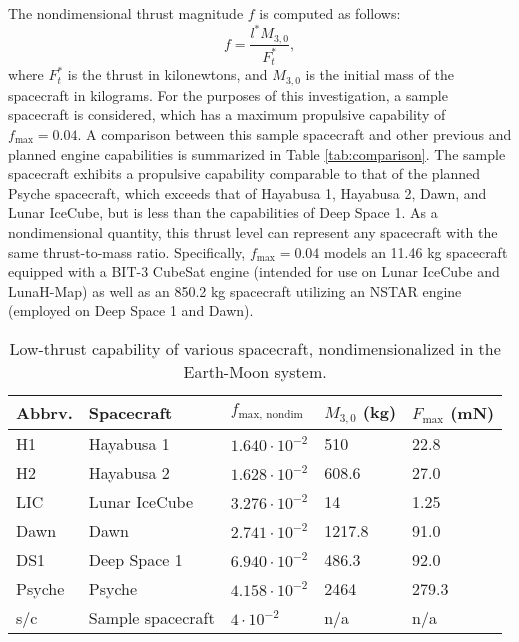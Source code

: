 \documentclass[conference]{IEEEtran}
\begin{document}
The nondimensional thrust magnitude \( f \) is computed as follows:
\begin{equation}
f = \frac{l^* M_{3,0}}{F_t^*},
\end{equation}
where \( F_t^* \) is the thrust in kilonewtons, and \( M_{3,0} \) is the initial mass of the spacecraft in kilograms. For the purposes of this investigation, a sample spacecraft is considered, which has a maximum propulsive capability of \( f_{\text{max}} = 0.04 \). A comparison between this sample spacecraft and other previous and planned engine capabilities is summarized in Table \ref{tab:comparison}. The sample spacecraft exhibits a propulsive capability comparable to that of the planned Psyche spacecraft, which exceeds that of Hayabusa 1, Hayabusa 2, Dawn, and Lunar IceCube, but is less than the capabilities of Deep Space 1. As a nondimensional quantity, this thrust level can represent any spacecraft with the same thrust-to-mass ratio. Specifically, \( f_{\text{max}} = 0.04 \) models an 11.46 kg spacecraft equipped with a BIT-3 CubeSat engine \cite{LunarIceCube} (intended for use on Lunar IceCube and LunaH-Map) as well as an 850.2 kg spacecraft utilizing an NSTAR engine \cite{DeepSpace1} (employed on Deep Space 1 and Dawn).
\begin{table*}[h!]
	\centering
	\caption{Low-thrust capability of various spacecraft, nondimensionalized in the Earth-Moon system.}
	\begin{tabular}{|l|l|l|l|l|}
	\hline
	\textbf{Abbrv.} & \textbf{Spacecraft} & \textbf{$f_{\text{max, nondim}}$} & \textbf{$M_{3,0}$ (kg)} & \textbf{$F_{\text{max}}$ (mN)} \\ \hline
	H1 & Hayabusa 1 \cite{40} & $1.640 \cdot 10^{-2}$ & 510 & 22.8 \\ \hline
	H2 & Hayabusa 2 \cite{41} & $1.628 \cdot 10^{-2}$ & 608.6 & 27.0 \\ \hline
	LIC & Lunar IceCube \cite{3,39} & $3.276 \cdot 10^{-2}$ & 14 & 1.25 \\ \hline
	Dawn & Dawn \cite{37} & $2.741 \cdot 10^{-2}$ & 1217.8 & 91.0 \\ \hline
	DS1 & Deep Space 1 \cite{36} & $6.940 \cdot 10^{-2}$ & 486.3 & 92.0 \\ \hline
	Psyche & Psyche \cite{5,42} & $4.158 \cdot 10^{-2}$ & 2464 & 279.3 \\ \hline
	s/c & Sample spacecraft & $4 \cdot 10^{-2}$ & n/a & n/a \\ \hline
	\end{tabular}
	\label{tab:camparison}	
\end{table*}
	
\end{document}
